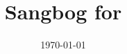 \documentclass[pdftex]{article}\title{Sangbog for  \theyear}\date{\today}
\begin{document}
\pagestyle{empty}
\begin{center}\selectfont\Huge  \the\year
\end{center}
\end{document}
